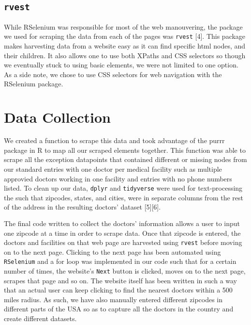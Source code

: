 \documentclass[10pt,letterpaper]{article}
\begin{document}
\subsection{\texorpdfstring{\texttt{rvest}}{rvest}}\label{rvest}

While RSelenium was responsible for most of the web manouvering, the
package we used for scraping the data from each of the pages was
\texttt{rvest} {[}4{]}. This package makes harvesting data from a
website easy as it can find specific html nodes, and their children. It
also allows one to use both XPaths and CSS selectors so though we
eventually stuck to using basic elements, we were not limited to one
option. As a side note, we chose to use CSS selectors for web navigation
with the RSelenium package.

\section{Data Collection}\label{data-collection}

We created a function to scrape this data and took advantage of the
purrr package in R to map all our scraped elements together. This
function was able to scrape all the exception datapoints that contained
different or missing nodes from our standard entries with one doctor per
medical facility such as multiple approvied doctors working in one
facility and entries with no phone numbers listed. To clean up our data,
\texttt{dplyr} and \texttt{tidyverse} were used for text-processing the
such that zipcodes, states, and cities, were in separate columns from
the rest of the address in the resulting doctors' dataset
{[}5{]}{[}6{]}.

The final code written to collect the doctors' information allows a user
to input one zipcode at a time in order to scrape data. Once that
zipcode is entered, the doctors and facilities on that web page are
harvested using \texttt{rvest} before moving on to the next page.
Clicking to the next page has been automated using \texttt{RSelenium}
and a for loop was implemented in our code such that for a certain
number of times, the website's \texttt{Next} button is clicked, moves on
to the next page, scrapes that page and so on. The website itself has
been written in such a way that an actual user can keep clicking to find
the nearest doctors within a 500 miles radius. As such, we have also
manually entered different zipcodes in different parts of the USA so as
to capture all the doctors in the country and create different datasets.
\end{document}
